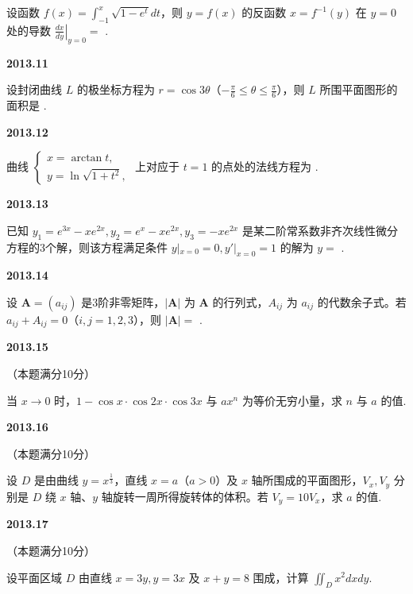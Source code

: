 \documentclass[UTF8,12pt,fontset=windows]{ctexart}
\begin{document}
设函数 $f(x) = \int_{-1}^x \sqrt{1 - e^t}dt$，则 $y = f(x)$ 的反函数 $x = f^{-1}(y)$ 在 $y = 0$ 处的导数 $\left.\frac{dx}{dy}\right|_{y = 0} =$ \underline{\hspace{20mm}}.

\vfill
\newpage
{\large\bfseries 2013.11}

设封闭曲线 $L$ 的极坐标方程为 $r = \cos 3\theta$（$-\frac{\pi}{6} \le \theta \le \frac{\pi}{6}$），则 $L$ 所围平面图形的面积是 \underline{\hspace{20mm}}.

\vfill
\newpage
{\large\bfseries 2013.12}

曲线 $\begin{cases} x = \arctan t, \\ y = \ln\sqrt{1 + t^2}, \end{cases}$ 上对应于 $t = 1$ 的点处的法线方程为 \underline{\hspace{20mm}}.

\vfill
\newpage
{\large\bfseries 2013.13}

已知 $y_1 = e^{3x} - xe^{2x}, y_2 = e^x - xe^{2x}, y_3 = -xe^{2x}$ 是某二阶常系数非齐次线性微分方程的3个解，则该方程满足条件 $y|_{x = 0} = 0, y'|_{x = 0} = 1$ 的解为 $y =$ \underline{\hspace{20mm}}.

\vfill
\newpage
{\large\bfseries 2013.14}

设 $\boldsymbol{A} = (a_{ij})$ 是3阶非零矩阵，$|\boldsymbol{A}|$ 为 $\boldsymbol{A}$ 的行列式，$A_{ij}$ 为 $a_{ij}$ 的代数余子式。若 $a_{ij} + A_{ij} = 0$（$i, j = 1, 2, 3$），则 $|\boldsymbol{A}| =$ \underline{\hspace{20mm}}.

\vfill
\newpage
{\large\bfseries 2013.15}

（本题满分10分）

当 $x \to 0$ 时，$1 - \cos x \cdot \cos 2x \cdot \cos 3x$ 与 $ax^n$ 为等价无穷小量，求 $n$ 与 $a$ 的值.

\vfill
\newpage
{\large\bfseries 2013.16}

（本题满分10分）

设 $D$ 是由曲线 $y = x^{\frac{1}{3}}$，直线 $x = a$（$a > 0$）及 $x$ 轴所围成的平面图形，$V_x, V_y$ 分别是 $D$ 绕 $x$ 轴、$y$ 轴旋转一周所得旋转体的体积。若 $V_y = 10V_x$，求 $a$ 的值.

\vfill
\newpage
{\large\bfseries 2013.17}

（本题满分10分）

设平面区域 $D$ 由直线 $x = 3y, y = 3x$ 及 $x + y = 8$ 围成，计算 $\iint_D x^2 dxdy$.
\end{document}
